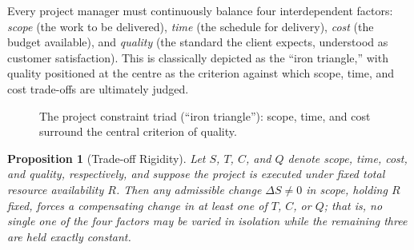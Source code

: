 \documentclass[12pt, a4paper]{report}
\theoremstyle{engnotes}
\newtheorem{prop}{Proposition}[section]
\begin{document}
Every project manager must continuously balance four interdependent factors: \emph{scope} (the work to be delivered), \emph{time} (the schedule for delivery), \emph{cost} (the budget available), and \emph{quality} (the standard the client expects, understood as customer satisfaction). This is classically depicted as the ``iron triangle,'' with quality positioned at the centre as the criterion against which scope, time, and cost trade-offs are ultimately judged.

\begin{figure}[H]
    \centering
    \caption{The project constraint triad (``iron triangle''): scope, time, and cost surround the central criterion of quality.}
    \label{fig:iron_triangle}
\end{figure}

\begin{prop}[Trade-off Rigidity]\label{prop:trade_off_rigidity}
    Let $S$, $T$, $C$, and $Q$ denote scope, time, cost, and quality, respectively, and suppose the project is executed under fixed total resource availability $R$. Then any admissible change $\Delta S \neq 0$ in scope, holding $R$ fixed, forces a compensating change in at least one of $T$, $C$, or $Q$; that is, no single one of the four factors may be varied in isolation while the remaining three are held exactly constant.
\end{prop}
\end{document}
